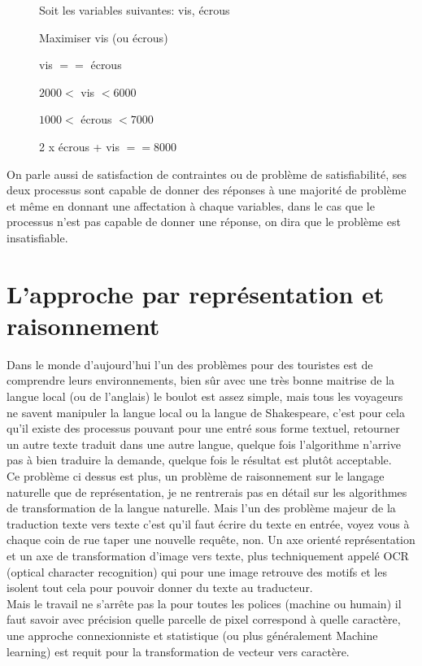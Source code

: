 \begin{description}
\item[] Soit les variables suivantes: vis, écrous
\item[] Maximiser vis (ou écrous)
\item[] vis $==$ écrous
\item[] $2000 <$ vis $< 6000$
\item[] $1000 <$ écrous $< 7000$
\item[] 2 x écrous + vis $== 8000$
\end{description}

On parle aussi de satisfaction de contraintes ou de problème de satisfiabilité, ses deux processus sont capable de donner des réponses à une majorité de problème et même en donnant une affectation à chaque variables, dans le cas que le processus n'est pas capable de donner une réponse, on dira que le problème est insatisfiable.

\pagebreak

\section{L'approche par représentation et raisonnement}

Dans le monde d'aujourd'hui l'un des problèmes pour des touristes est de comprendre leurs environnements, bien sûr avec une très bonne maitrise de la langue local (ou de l'anglais) le boulot est assez simple, mais tous les voyageurs ne savent manipuler la langue local ou la langue de Shakespeare, c'est pour cela qu'il existe des processus pouvant pour une entré sous forme textuel, retourner un autre texte traduit dans une autre langue, quelque fois l'algorithme n'arrive pas à bien traduire la demande, quelque fois le résultat est plutôt acceptable.\\
Ce problème ci dessus est plus, un problème de raisonnement sur le langage naturelle que de représentation, je ne rentrerais pas en détail sur les algorithmes de transformation de la langue naturelle. Mais l'un des problème majeur de la traduction texte vers texte c'est qu'il faut écrire du texte en entrée, voyez vous à chaque coin de rue taper une nouvelle requête, non. Un axe orienté représentation et un axe de transformation d'image vers texte, plus techniquement appelé OCR (optical character recognition) qui pour une image retrouve des motifs et les isolent tout cela pour pouvoir donner du texte au traducteur.\\
Mais le travail ne s'arrête pas la  pour toutes les polices (machine ou humain) il faut savoir avec précision quelle parcelle de pixel correspond à quelle caractère, une approche connexionniste et statistique (ou plus généralement Machine learning) est requit pour la transformation de vecteur vers caractère.

\pagebreak
